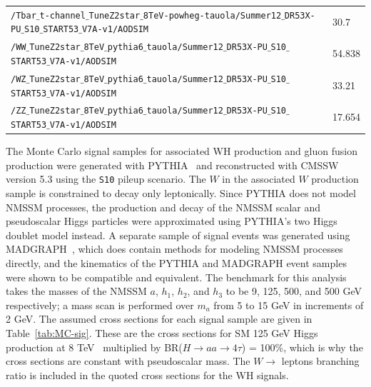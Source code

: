 \begin{table}
\begin{center}
\begin{tabular}{| l | l |}
	\texttt{/Tbar$\_$t-channel$\_$TuneZ2star$\_$8TeV-powheg-tauola/Summer12$\_$DR53X-PU$\_$S10$\_$START53$\_$V7A-v1/AODSIM} & 30.7 \\
	\texttt{/WW$\_$TuneZ2star$\_$8TeV$\_$pythia6$\_$tauola/Summer12$\_$DR53X-PU$\_$S10$\_$START53$\_$V7A-v1/AODSIM} & 54.838 \\
	\texttt{/WZ$\_$TuneZ2star$\_$8TeV$\_$pythia6$\_$tauola/Summer12$\_$DR53X-PU$\_$S10$\_$START53$\_$V7A-v1/AODSIM} & 33.21 \\
	\texttt{/ZZ$\_$TuneZ2star$\_$8TeV$\_$pythia6$\_$tauola/Summer12$\_$DR53X-PU$\_$S10$\_$START53$\_$V7A-v1/AODSIM} & 17.654 \\
	\hline
\end{tabular}
\end{center}
\end{table}

The Monte Carlo signal samples for associated WH production and gluon fusion production were generated with PYTHIA~\cite{1126-6708-2006-05-026} and reconstructed with CMSSW version 5.3 using the \texttt{S10} pileup scenario. The $W$ in the associated $W$ production sample is constrained to decay only leptonically. Since PYTHIA does not model NMSSM processes, the production and decay of the NMSSM scalar and pseudoscalar Higgs particles were approximated using PYTHIA's two Higgs doublet model instead. A separate sample of signal events was generated using MADGRAPH~\cite{springerlink:10.1007/JHEP06(2011)128}, which does contain methods for modeling NMSSM processes directly, and the kinematics of the PYTHIA and MADGRAPH event samples were shown to be compatible and equivalent. The benchmark for this analysis takes the masses of the NMSSM $a$, $h_1$, $h_2$, and $h_3$ to be 9, 125, 500, and 500 GeV respectively; a mass scan is performed over $m_{a}$ from 5 to 15 GeV in increments of 2 GeV.  The assumed cross sections for each signal sample are given in Table~\ref{tab:MC-sig}.  These are the cross sections for SM 125 GeV Higgs production at 8 TeV~\cite{LHCHXSWG} multiplied by BR($H\rightarrow$$aa\rightarrow4\tau$) = 100\%, which is why the cross sections are constant with pseudoscalar mass.  The $W\rightarrow$ leptons branching ratio is included in the quoted cross sections for the WH signals.

